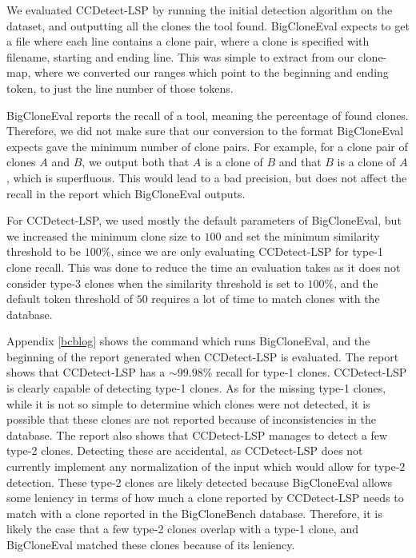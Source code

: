 We evaluated CCDetect-LSP by running the initial detection algorithm on the dataset, and
outputting all the clones the tool found. BigCloneEval expects to get a file where each
line contains a clone pair, where a clone is specified with filename, starting and
ending line. This was simple to extract from our clone-map, where we converted our ranges
which point to the beginning and ending token, to just the line number of those tokens.

BigCloneEval reports the recall of a tool, meaning the percentage of found clones.
Therefore, we did not make sure that our conversion to the format BigCloneEval expects
gave the minimum number of clone pairs. For example, for a clone pair of clones $A$ and
$B$, we output both that $A$ is a clone of $B$ and that $B$ is a clone of $A$, which is
superfluous. This would lead to a bad precision, but does not affect the recall in the
report which BigCloneEval outputs.

For CCDetect-LSP, we used mostly the default parameters of BigCloneEval, but we increased
the minimum clone size to $100$ and set the minimum similarity threshold to be $100\%$,
since we are only evaluating CCDetect-LSP for type-1 clone recall. This was done to reduce
the time an evaluation takes as it does not consider type-3 clones when the similarity
threshold is set to $100\%$, and the default token threshold of $50$ requires a lot of
time to match clones with the database.

Appendix \ref{bcblog} shows the command which runs BigCloneEval, and the beginning of the
report generated when CCDetect-LSP is evaluated. The report shows that CCDetect-LSP has a
${\sim}99.98\%$ recall for type-1 clones. CCDetect-LSP is clearly capable of detecting
type-1 clones. As for the missing type-1 clones, while it is not so simple to determine
which clones were not detected, it is possible that these clones are not reported because
of inconsistencies in the database. The report also shows that CCDetect-LSP manages to
detect a few type-2 clones. Detecting these are accidental, as CCDetect-LSP does not
currently implement any normalization of the input which would allow for type-2 detection.
These type-2 clones are likely detected because BigCloneEval allows some leniency in terms
of how much a clone reported by CCDetect-LSP needs to match with a clone reported in the
BigCloneBench database. Therefore, it is likely the case that a few type-2 clones overlap
with a type-1 clone, and BigCloneEval matched these clones because of its leniency.

